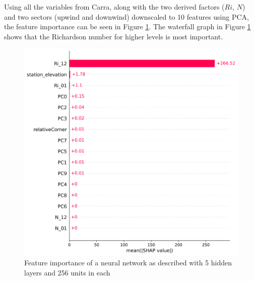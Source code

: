 Using all the variables from Carra, along with the two derived factors ($Ri$, $N$) and two sectors (upwind and downwind) downscaled to 10 features using PCA, the feature importance can be seen in Figure \ref{fig:ShapleyWaterfallFirstTry}. The waterfall graph in Figure \ref{fig:ShapleyWaterfallFirstTry} shows that the Richardson number for higher levels is most important.

\begin{figure}[h]
    \caption{Feature importance of a neural network as described with 5 hidden layers and 256 units in each}
    \label{fig:ShapleyWaterfallFirstTry}
    \centering
    \includegraphics[scale = 0.6]{Figures/shap_bar_nn_256_example100.png}
\end{figure}
